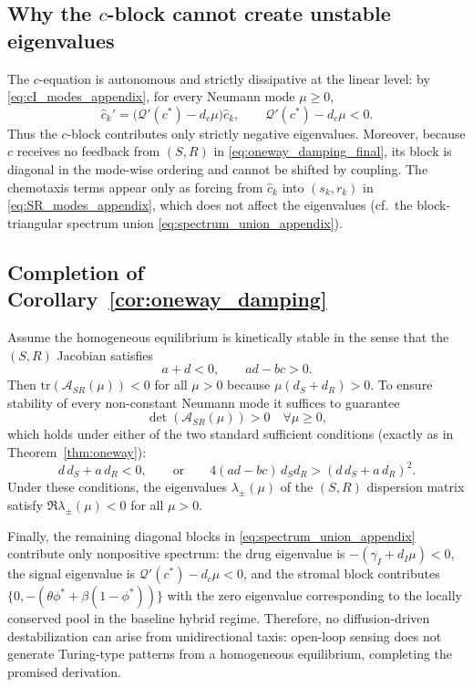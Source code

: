 \documentclass[pdflatex,sn-mathphys-ay]{sn-jnl}
\theoremstyle{thmstyleone}
\theoremstyle{definition}
\theoremstyle{remark}
\begin{document}
\begin{appendices}
\subsection{Why the \texorpdfstring{$c$}{c}-block cannot create unstable eigenvalues}
The $c$-equation is autonomous and strictly dissipative at the linear level: by \eqref{eq:cI_modes_appendix}, for every Neumann mode $\mu\ge 0$,
\[
\hat c_k'=\bigl(\mathcal Q'(c^*)-d_c\mu\bigr)\hat c_k,
\qquad \mathcal Q'(c^*)-d_c\mu<0.
\]
Thus the $c$-block contributes only strictly negative eigenvalues.  Moreover, because $c$ receives no feedback from $(S,R)$ in \eqref{eq:oneway_damping_final}, its block is diagonal in the mode-wise ordering and cannot be shifted by coupling.  The chemotaxis terms appear only as forcing from $\hat c_k$ into $(s_k,r_k)$ in \eqref{eq:SR_modes_appendix}, which does not affect the eigenvalues (cf.\ the block-triangular spectrum union \eqref{eq:spectrum_union_appendix}).

\subsection{Completion of Corollary~\ref{cor:oneway_damping}}
Assume the homogeneous equilibrium is kinetically stable in the sense that the $(S,R)$ Jacobian satisfies
\begin{equation}
\label{eq:kinetic_stability_appendix}
a+d<0,\qquad ad-bc>0.
\end{equation}
Then $\mathrm{tr}(\mathcal A_{SR}(\mu))<0$ for all $\mu>0$ because $\mu(d_S+d_R)>0$.  To ensure stability of every non-constant Neumann mode it suffices to guarantee
\[
\det(\mathcal A_{SR}(\mu))>0\quad\forall \mu\ge 0,
\]
which holds under either of the two standard sufficient conditions (exactly as in Theorem~\ref{thm:oneway}):
\[
d\,d_S+a\,d_R<0,
\qquad \text{or}\qquad
4(ad-bc)\,d_Sd_R>(d\,d_S+a\,d_R)^2.
\]
Under these conditions, the eigenvalues $\lambda_\pm(\mu)$ of the $(S,R)$ dispersion matrix satisfy $\Re\lambda_\pm(\mu)<0$ for all $\mu>0$.

Finally, the remaining diagonal blocks in \eqref{eq:spectrum_union_appendix} contribute only nonpositive spectrum: the drug eigenvalue is $-(\gamma_I+d_I\mu)<0$, the signal eigenvalue is $\mathcal Q'(c^*)-d_c\mu<0$, and the stromal block contributes $\{0,-(\theta\phi^*+\beta(1-\phi^*))\}$ with the zero eigenvalue corresponding to the locally conserved pool in the baseline hybrid regime. Therefore, no diffusion-driven destabilization can arise from unidirectional taxis: open-loop sensing does not generate Turing-type patterns from a homogeneous equilibrium, completing the promised derivation.


\end{appendices}
\end{document}
